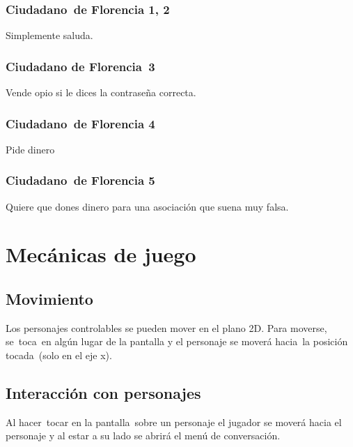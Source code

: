 \subsubsection[Ciudadano\ de Florencia 1, 2]{ Ciudadano\ de Florencia 1, 2}
\hypertarget{Toc484614245}{}{
Simplemente saluda.\ }

\subsubsection[Ciudadano de Florencia\ 3]{ Ciudadano de Florencia\ 3}
\hypertarget{Toc484614246}{}{
Vende opio si le dices la contrase\~na correcta.}

\subsubsection[Ciudadano\ de Florencia 4]{ Ciudadano\ de Florencia 4}
\hypertarget{Toc484614247}{}{
Pide dinero}

\subsubsection[Ciudadano\ de Florencia 5]{ Ciudadano\ de Florencia 5}
\hypertarget{Toc484614248}{}{
\foreignlanguage{spanish}{Quiere que dones dinero para una asociaci\'on que suena muy falsa.}}

\section[Mec\'anicas de juego]{ Mec\'anicas de juego}
\hypertarget{Toc484614249}{}\subsection[Movimiento]{ Movimiento}
\hypertarget{Toc484614250}{}{
Los personajes controlables se pueden mover en el plano 2D. Para moverse, se\ toca\ en alg\'un lugar de la pantalla y el
personaje se mover\'a hacia\ la posici\'on tocada\ (solo en el eje x).}

\subsection[Interacci\'on con personajes]{ Interacci\'on con personajes}
\hypertarget{Toc484614251}{}{
Al hacer\ tocar en la pantalla\ sobre un personaje el jugador se mover\'a hacia el personaje y al estar a su lado se
abrir\'a el men\'u de conversaci\'on.}

